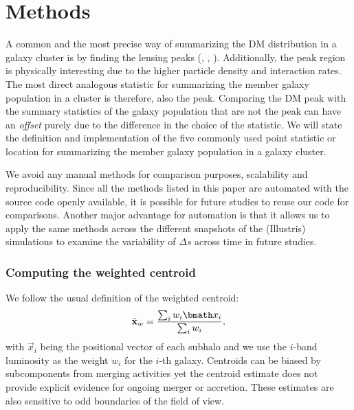 \section{Methods}\label{sec:methods}
A common and the most precise way of summarizing the DM distribution in a
galaxy cluster is by finding the lensing peaks 
(\citealt{Medezinski2013}, \citealt{Markevitch2004}, \citealt{Zitrin13}).
Additionally, the peak region is physically 
interesting due to the higher particle density and interaction rates. 
The most direct analogous statistic for summarizing the member galaxy
population in a cluster is therefore, also the peak. 
Comparing the DM peak with the summary statistics of the galaxy population that
are not the peak  can have an {\it offset} purely due to the difference in
the choice of the statistic. 
We will state the definition and implementation of the five commonly used 
point statistic or location for summarizing 
the member galaxy population in a galaxy cluster.

We avoid any manual methods for
comparison purposes, scalability and reproducibility. 
Since all the methods listed in this
paper are automated with the source code openly available, 
it is possible for future studies to reuse our code for comparisons. 
Another major advantage for automation is that it allows us  
to apply
the same methods across the different snapshots of the (Illustris) simulations to
examine the variability of $\Delta s$ across time in future studies. 


\subsubsection{Computing the weighted centroid}
\label{subsubsec:weighted_centroid}
We follow the usual definition of the weighted centroid: 
\begin{equation}
	\bar{\bf x}_w = \frac{\sum_i w_i \vec{x}_i}{\sum_i w_i},
\end{equation}
with $\vec{x}_i$ being the positional vector of each subhalo 
and we use the $i$-band luminosity 
as the weight $w_i$ for the $i$-th galaxy.
Centroids can be biased by subcomponents from merging activities yet the
centroid estimate does not provide explicit evidence for ongoing merger or 
accretion. These estimates are also sensitive to odd boundaries 
of the field of view.

